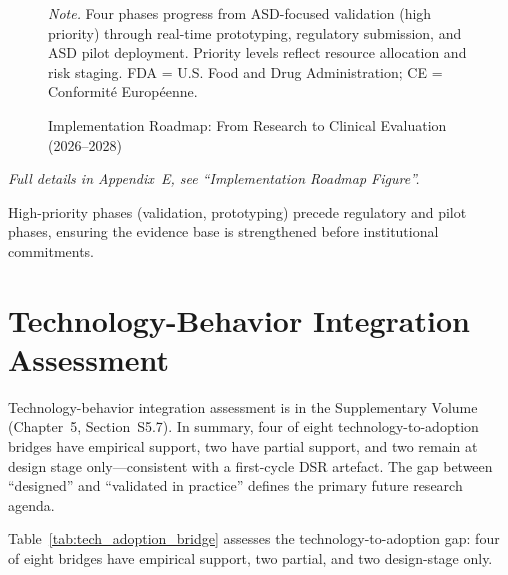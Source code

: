 \begin{figure}[!htbp]
{%
    }
    \caption[Implementation Roadmap (2026--2028)]{Implementation Roadmap: From Research to Clinical Evaluation (2026--2028)}
    \label{fig:implementation_roadmap}
    \vspace{0.5em}\noindent\textit{Note.} Four phases progress from ASD-focused validation (high priority) through real-time prototyping, regulatory submission, and ASD pilot deployment. Priority levels reflect resource allocation and risk staging. FDA = U.S. Food and Drug Administration; CE = Conformit\'{e} Europ\'{e}enne.
\end{figure}
\fi
\noindent\textit{Full details in Appendix~E, see ``Implementation Roadmap Figure''.}


\noindent High-priority phases (validation, prototyping) precede regulatory and pilot phases, ensuring the evidence base is strengthened before institutional commitments.

\section{Technology-Behavior Integration Assessment}

Technology-behavior integration assessment is in the Supplementary Volume (Chapter~5, Section~S5.7). In summary, four of eight technology-to-adoption bridges have empirical support, two have partial support, and two remain at design stage only---consistent with a first-cycle DSR artefact. The gap between ``designed'' and ``validated in practice'' defines the primary future research agenda.

\iffalse
Table~\ref{tab:tech_adoption_bridge} assesses the technology-to-adoption gap: four of eight bridges have empirical support, two partial, and two design-stage only.

